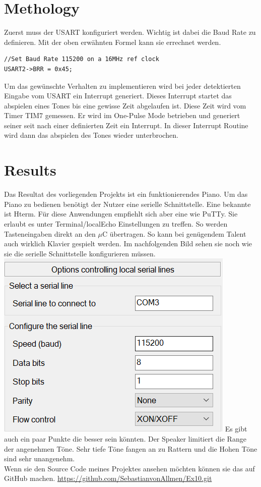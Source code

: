 \documentclass[
   10.5pt,
   invert-title=true,
   titlepage=false,
   titleimage-ratio=13,
   class=article
]{bfhpub}				%
\begin{document}
\begin{multicols}{2}
\section*{Methology}
Zuerst muss der USART konfiguriert werden. Wichtig ist dabei die Baud Rate zu definieren. Mit der oben erwähnten Formel kann sie errechnet werden.
\begin{lstlisting}[style=CStyle]
//Set Baud Rate 115200 on a 16MHz ref clock
USART2->BRR = 0x45;
\end{lstlisting}
Um das gewünschte Verhalten zu implementieren wird bei jeder detektierten Eingabe vom USART ein Interrupt generiert. Dieses Interrupt startet das abspielen eines Tones bis eine gewisse Zeit abgelaufen ist. Diese Zeit wird vom Timer TIM7 gemessen. Er wird im One-Pulse Mode betrieben und generiert seiner seit nach einer definierten Zeit ein Interrupt. In dieser Interrupt Routine wird dann das abspielen des Tones wieder unterbrochen. 
\section*{Results}
Das Resultat des vorliegenden Projekts ist ein funktionierendes Piano. Um das Piano zu bedienen benötigt der Nutzer eine serielle Schnittstelle. Eine bekannte ist Hterm. Für diese Anwendungen empfiehlt sich aber eine wie PuTTy. Sie erlaubt es unter Terminal/localEcho Einstellungen zu treffen. So werden Tasteneingaben direkt an den $\mu$C übertragen. So kann bei genügendem Talent auch wirklich Klavier gespielt werden. Im nachfolgenden Bild sehen sie noch wie sie die serielle Schnittstelle konfigurieren müssen.
\includegraphics[width=70mm\\]{PuTTY} 
\newline Es gibt auch ein paar Punkte die besser sein könnten. Der Speaker limitiert die Range der angenehmen Töne. Sehr tiefe Töne fangen an zu Rattern und die Hohen Töne sind sehr unangenehm. \\
Wenn sie den Source Code meines Projektes ansehen möchten können sie das auf GitHub machen. \url{https://github.com/SebastianvonAllmen/Ex10.git}

\end{multicols}
\end{document}
